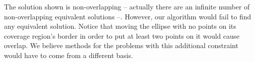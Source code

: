 		The solution shown is non-overlapping -- actually there are an infinite number of non-overlapping equivalent solutions --. However, our algorithm would fail to find any equivalent solution. Notice that moving the ellipse with no points on its coverage region's border in order to put at least two points on it would cause overlap.
		We believe methods for the problems with this additional constraint would have to come from a different basis.
		
		
